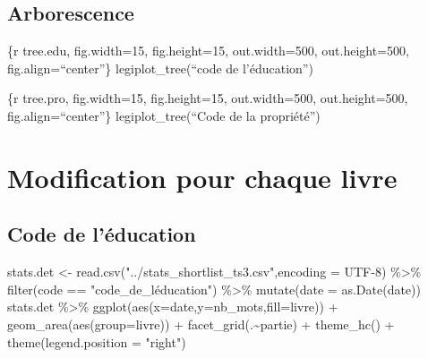 \documentclass[
  oneside]{book}
\newenvironment{Shaded}{\begin{snugshade}}{\end{snugshade}}
\newcommand{\AttributeTok}[1]{\textcolor[rgb]{0.77,0.63,0.00}{#1}}
\newcommand{\FunctionTok}[1]{\textcolor[rgb]{0.00,0.00,0.00}{#1}}
\newcommand{\NormalTok}[1]{#1}
\newcommand{\OtherTok}[1]{\textcolor[rgb]{0.56,0.35,0.01}{#1}}
\newcommand{\SpecialCharTok}[1]{\textcolor[rgb]{0.00,0.00,0.00}{#1}}
\newcommand{\StringTok}[1]{\textcolor[rgb]{0.31,0.60,0.02}{#1}}
\begin{document}
\hypertarget{arborescence}{%
\subsection{Arborescence}\label{arborescence}}

\{r tree.edu, fig.width=15, fig.height=15, out.width=500, out.height=500, fig.align=``center''\}
legiplot\_tree(``code de l'éducation'')

\{r tree.pro, fig.width=15, fig.height=15, out.width=500, out.height=500, fig.align=``center''\}
legiplot\_tree(``Code de la propriété'')

\hypertarget{modification-pour-chaque-livre}{%
\section{Modification pour chaque livre}\label{modification-pour-chaque-livre}}

\hypertarget{code-de-luxe9ducation}{%
\subsection{Code de l'éducation}\label{code-de-luxe9ducation}}

\begin{Shaded}
\begin{Highlighting}[]
\NormalTok{stats.det }\OtherTok{\textless{}{-}} \FunctionTok{read.csv}\NormalTok{(}\StringTok{"../stats\_shortlist\_ts3.csv"}\NormalTok{,}\AttributeTok{encoding =} \StringTok{\textquotesingle{}UTF{-}8\textquotesingle{}}\NormalTok{) }\SpecialCharTok{\%\textgreater{}\%}
  \FunctionTok{filter}\NormalTok{(code }\SpecialCharTok{==} \StringTok{"code\_de\_l\textquotesingle{}éducation"}\NormalTok{) }\SpecialCharTok{\%\textgreater{}\%}
  \FunctionTok{mutate}\NormalTok{(}\AttributeTok{date =} \FunctionTok{as.Date}\NormalTok{(date)) }
\NormalTok{stats.det }\SpecialCharTok{\%\textgreater{}\%}
  \FunctionTok{ggplot}\NormalTok{(}\FunctionTok{aes}\NormalTok{(}\AttributeTok{x=}\NormalTok{date,}\AttributeTok{y=}\NormalTok{nb\_mots,}\AttributeTok{fill=}\NormalTok{livre)) }\SpecialCharTok{+}
  \FunctionTok{geom\_area}\NormalTok{(}\FunctionTok{aes}\NormalTok{(}\AttributeTok{group=}\NormalTok{livre)) }\SpecialCharTok{+}
  \FunctionTok{facet\_grid}\NormalTok{(.}\SpecialCharTok{\textasciitilde{}}\NormalTok{partie)  }\SpecialCharTok{+}
  \FunctionTok{theme\_hc}\NormalTok{() }\SpecialCharTok{+} 
  \FunctionTok{theme}\NormalTok{(}\AttributeTok{legend.position =} \StringTok{"right"}\NormalTok{)}
\end{Highlighting}
\end{Shaded}
\end{document}
